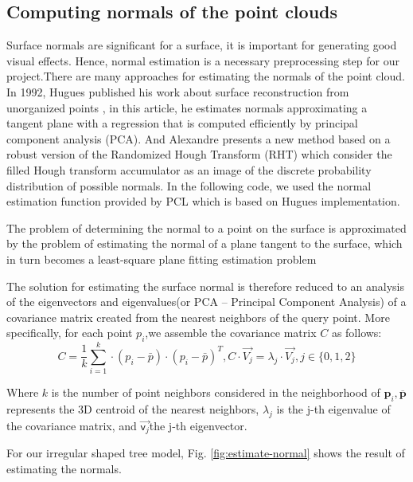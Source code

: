 \documentclass[runningheads,a4paper]{llncs}
\begin{document}
\subsection{Computing normals of the point clouds}
Surface normals are significant for a surface, it is important for generating good visual effects. Hence, normal estimation is a necessary preprocessing step for our project.There are many approaches for estimating the normals of the point cloud. In 1992, Hugues published his work about surface reconstruction from unorganized points \cite{14}, in this article, he estimates normals approximating a tangent plane with a regression that is computed efficiently by principal component analysis (PCA). And Alexandre presents a new method based on a robust version of the Randomized Hough Transform (RHT) which consider the filled Hough
transform accumulator as an image of the discrete probability distribution of possible normals. In the following code, we used the normal estimation function provided by PCL which is based on Hugues implementation.

The problem of determining the normal to a point on the surface is approximated by the problem of estimating the normal of a plane tangent to the surface, which in turn becomes a least-square plane fitting estimation problem \cite{15}

The solution for estimating the surface normal is therefore reduced to an analysis of the eigenvectors and eigenvalues(or PCA – Principal Component Analysis) of a covariance matrix created from the nearest neighbors of the query point. More specifically, for each point $p_i$,we assemble the covariance matrix $C$ as follows:
\begin{equation}
C = \frac{1}{k} \sum_{i=1}^{k} \cdot (p_i - \bar{p}) \cdot (p_i - \bar{p})^T , C \cdot \overrightarrow{V_j} = \lambda_j \cdot \overrightarrow{V_j}, j\in \{ 0, 1, 2 \}
\end{equation}

Where $k$ is the number of point neighbors considered in the neighborhood of $\boldsymbol{p}_i, \overline{\boldsymbol{p}}$ represents the 3D centroid of the nearest neighbors, $\lambda_j$ is the j-th eigenvalue of the covariance matrix, and $\vec{{\mathsf v}_j} $the j-th eigenvector.

For our irregular shaped tree model, Fig. \ref{fig:estimate-normal} shows the result of estimating the normals.
\end{document}
